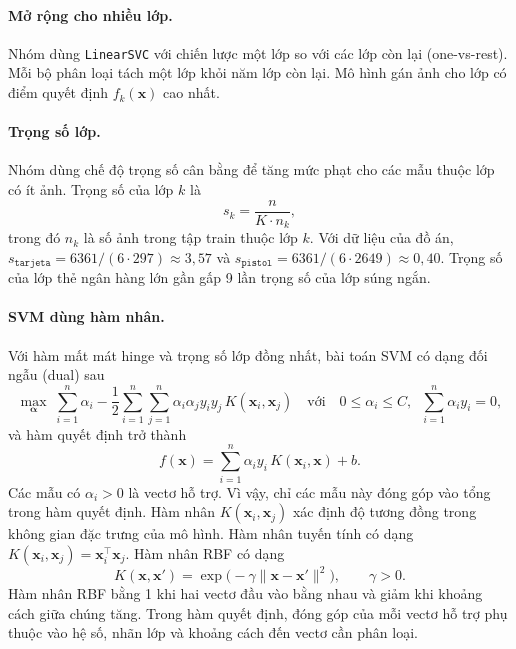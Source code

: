 \paragraph{Mở rộng cho nhiều lớp.} Nhóm dùng \texttt{LinearSVC} với chiến lược một lớp so với các lớp còn lại (one-vs-rest). Mỗi bộ phân loại tách một lớp khỏi năm lớp còn lại. Mô hình gán ảnh cho lớp có điểm quyết định $f_k(\mathbf{x})$ cao nhất.

\paragraph{Trọng số lớp.} Nhóm dùng chế độ trọng số cân bằng để tăng mức phạt cho các mẫu thuộc lớp có ít ảnh. Trọng số của lớp $k$ là
\begin{equation}
  s_k = \frac{n}{K \cdot n_k},
  \label{eq:classweight}
\end{equation}
trong đó $n_k$ là số ảnh trong tập train thuộc lớp $k$. Với dữ liệu của đồ án, $s_{\texttt{tarjeta}} = 6361 / (6 \cdot 297) \approx 3{,}57$ và $s_{\texttt{pistol}} = 6361 / (6 \cdot 2649) \approx 0{,}40$. Trọng số của lớp thẻ ngân hàng lớn gần gấp 9 lần trọng số của lớp súng ngắn.

\paragraph{SVM dùng hàm nhân.} Với hàm mất mát hinge và trọng số lớp đồng nhất, bài toán SVM có dạng đối ngẫu (dual) sau
\begin{equation}
  \max_{\bm{\alpha}} \; \sum_{i=1}^{n} \alpha_i - \frac{1}{2} \sum_{i=1}^{n} \sum_{j=1}^{n} \alpha_i \alpha_j y_i y_j \, K(\mathbf{x}_i, \mathbf{x}_j)
  \quad \text{với} \quad 0 \le \alpha_i \le C, \;\; \sum_{i=1}^{n} \alpha_i y_i = 0 ,
\end{equation}
và hàm quyết định trở thành
\begin{equation}
  f(\mathbf{x}) = \sum_{i=1}^{n} \alpha_i y_i \, K(\mathbf{x}_i, \mathbf{x}) + b .
\end{equation}
Các mẫu có $\alpha_i > 0$ là vectơ hỗ trợ. Vì vậy, chỉ các mẫu này đóng góp vào tổng trong hàm quyết định. Hàm nhân $K(\mathbf{x}_i, \mathbf{x}_j)$ xác định độ tương đồng trong không gian đặc trưng của mô hình. Hàm nhân tuyến tính có dạng $K(\mathbf{x}_i, \mathbf{x}_j) = \mathbf{x}_i^\top \mathbf{x}_j$. Hàm nhân RBF có dạng
\begin{equation}
  K(\mathbf{x}, \mathbf{x}') = \exp\!\bigl(-\gamma \lVert \mathbf{x} - \mathbf{x}' \rVert^2\bigr), \qquad \gamma > 0 .
  \label{eq:rbf}
\end{equation}
Hàm nhân RBF bằng 1 khi hai vectơ đầu vào bằng nhau và giảm khi khoảng cách giữa chúng tăng. Trong hàm quyết định, đóng góp của mỗi vectơ hỗ trợ phụ thuộc vào hệ số, nhãn lớp và khoảng cách đến vectơ cần phân loại.

